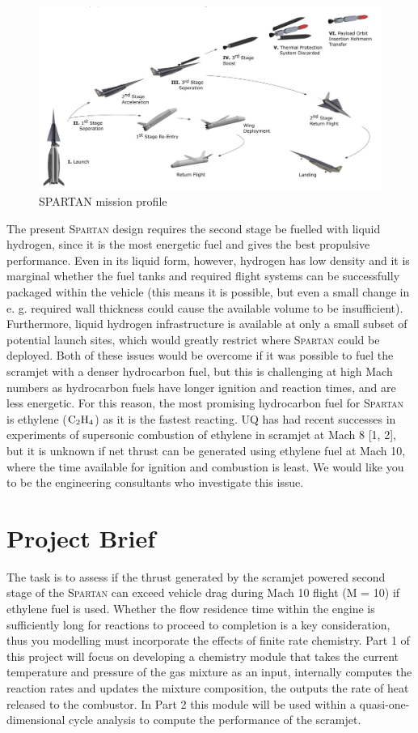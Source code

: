 \documentclass[a4paper]{article}
\begin{document}
\begin{figure}[H]
    \centering
    \includegraphics[width=0.9\linewidth]{part_2_img/spartan_overview.png}
    \caption{\textsc{SPARTAN} mission profile}
    \label{fig:mission_profile}
\end{figure}

The present \textsc{Spartan} design requires the second stage be fuelled with liquid hydrogen, since it is the most energetic fuel and gives the best propulsive performance. Even in its liquid form, however, hydrogen has low density and it is marginal whether the fuel tanks and required flight systems can be successfully packaged within the vehicle (this means it is possible, but even a small change in e. g. required wall thickness could cause the available volume to be insufficient). Furthermore, liquid hydrogen infrastructure is available at only a small subset of potential launch sites, which would greatly restrict where \textsc{Spartan} could be deployed. Both of these issues would be overcome if it was possible to fuel the scramjet with a denser hydrocarbon fuel, but this is challenging at high Mach numbers as hydrocarbon fuels have longer ignition and reaction times, and are less energetic. For this reason, the most promising hydrocarbon fuel for \textsc{Spartan} is ethylene (\(\ce{C2H4}\)) as it is the fastest reacting. UQ has had recent successes in experiments of supersonic combustion of ethylene in scramjet at Mach 8 [1, 2], but it is unknown if net thrust can be generated using ethylene fuel at Mach 10, where the time available for ignition and combustion is least. We would like you to be the engineering consultants who investigate this issue.

\section{Project Brief}
The task is to assess if the thrust generated by the scramjet powered second stage of the \textsc{Spartan} can exceed vehicle drag during Mach 10 flight (M = 10) if ethylene fuel is used. Whether the flow residence time within the engine is sufficiently long for reactions to proceed to completion is a key consideration, thus you modelling must incorporate the effects of finite rate chemistry. Part 1 of this project will focus on developing a chemistry module that takes the current temperature and pressure of the gas mixture as an input, internally computes the reaction rates and updates the mixture composition, the outputs the rate of heat released to the combustor. In Part 2 this module will be used within a quasi-one-dimensional cycle analysis to compute the performance of the scramjet.
\end{document}
